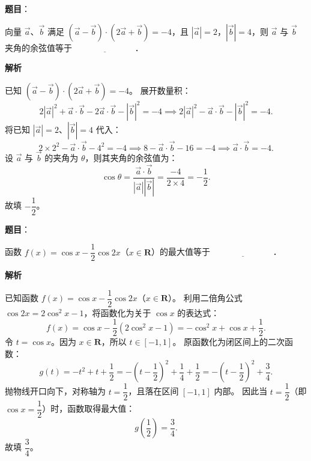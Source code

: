 \begin{answer}

\textbf{题目}：

向量 $\vec{a}$、$\vec{b}$ 满足 $(\vec{a}-\vec{b})\cdot(2\vec{a}+\vec{b})=-4$，且 $|\vec{a}|=2$，$|\vec{b}|=4$，则 $\vec{a}$ 与 $\vec{b}$ 夹角的余弦值等于 $\underline{\hspace{3cm}}$．

\textbf{解析}

已知 $(\vec{a}-\vec{b})\cdot(2\vec{a}+\vec{b})=-4$。
展开数量积：
\nopagebreak[4]
\[
2|\vec{a}|^2+\vec{a}\cdot\vec{b}-2\vec{a}\cdot\vec{b}-|\vec{b}|^2=-4\implies 2|\vec{a}|^2-\vec{a}\cdot\vec{b}-|\vec{b}|^2=-4.
\]
将已知 $|\vec{a}|=2$、$|\vec{b}|=4$ 代入：
\nopagebreak[4]
\[
2\times 2^2-\vec{a}\cdot\vec{b}-4^2=-4\implies 8-\vec{a}\cdot\vec{b}-16=-4\implies\vec{a}\cdot\vec{b}=-4.
\]
设 $\vec{a}$ 与 $\vec{b}$ 的夹角为 $\theta$，则其夹角的余弦值为：
\nopagebreak[4]
\[
\cos\theta=\frac{\vec{a}\cdot\vec{b}}{|\vec{a}||\vec{b}|}=\frac{-4}{2\times 4}=-\frac{1}{2}.
\]
故填 $-\dfrac{1}{2}$。


\end{answer}
\begin{answer}

\textbf{题目}：

函数 $f(x)=\cos x-\dfrac{1}{2}\cos 2x$（$x\in\mathbf{R}$）的最大值等于 $\underline{\hspace{3cm}}$．

\textbf{解析}

已知函数 $f(x)=\cos x-\dfrac{1}{2}\cos 2x$（$x\in\mathbf{R}$）。
利用二倍角公式 $\cos 2x=2\cos^2 x-1$，将函数化为关于 $\cos x$ 的表达式：
\nopagebreak[4]
\[
f(x)=\cos x-\frac{1}{2}(2\cos^2 x-1)=-\cos^2 x+\cos x+\frac{1}{2}.
\]
令 $t=\cos x$。因为 $x\in\mathbf{R}$，所以 $t\in[-1,1]$。
原函数化为闭区间上的二次函数：
\nopagebreak[4]
\[
g(t)=-t^2+t+\frac{1}{2}=-\left(t-\frac{1}{2}\right)^2+\frac{1}{4}+\frac{1}{2}=-\left(t-\frac{1}{2}\right)^2+\frac{3}{4}.
\]
抛物线开口向下，对称轴为 $t=\dfrac{1}{2}$，且落在区间 $[-1,1]$ 内部。
因此当 $t=\dfrac{1}{2}$（即 $\cos x=\dfrac{1}{2}$）时，函数取得最大值：
\nopagebreak[4]
\[
g\left(\frac{1}{2}\right)=\frac{3}{4}.
\]
故填 $\dfrac{3}{4}$。


\end{answer}
